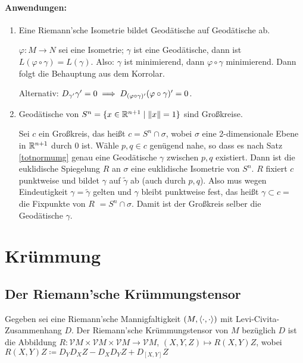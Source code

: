 \documentclass[a4paper,twoside,DIV15,BCOR12mm]{scrbook}
\renewcommand{\da}{\coloneqq}
\newcommand{\V}{\mathcal V}
\begin{document}
\subsubsection*{Anwendungen:}
\begin{enumerate}
\item Eine Riemann’sche Isometrie bildet Geodätische auf Geodätische ab.
\begin{beweis}
$\varphi: M \to N$ sei eine Isometrie; $\gamma$ ist eine Geodätische, dann ist $L(\varphi \circ \gamma) = L(\gamma)$. Also: $\gamma$ ist minimierend, dann $\varphi\circ \gamma$ minimierend. Dann folgt die Behauptung aus dem Korrolar.

Alternativ: $D_{\gamma'}{\gamma'} = 0 \implies D_{(\varphi\circ \gamma)'}(\varphi\circ\gamma)' = 0$.
\end{beweis}
\item Geodätische von $S^n=\{x \in \mathbb{R}^{n+1}\mid \|x\| = 1\}$ sind Großkreise.
\begin{beweis}
Sei $c$ ein Großkreis, das heißt $c = S^n \cap \sigma$, wobei $\sigma$ eine 2-dimensionale Ebene in $\mathbb{R}^{n+1}$ durch 0 ist. Wähle $p,q\in c$ genügend nahe, so dass es nach Satz \ref{totnormumg} genau eine Geodätische $\gamma$ zwischen $p,q$ existiert. Dann ist die euklidische Spiegelung $R$ an $\sigma$ eine euklidische Isometrie von $S^n$. $R$ fixiert $c$ punktweise und bildet $\gamma$  auf $\tilde\gamma$ ab (auch durch $p,q$). Also mus wegen Eindeutigkeit $\gamma = \tilde \gamma$ gelten und $\gamma$ bleibt punktweise fest, das heißt $\gamma\subset c = $ die Fixpunkte von $R$ $= S^n\cap \sigma$. Damit ist der Großkreis selber die Geodätische $\gamma$.
\end{beweis}
\end{enumerate}

\chapter{Krümmung}


\section{Der Riemann’sche Krümmungstensor}

Gegeben sei eine Riemann’sche Mannigfaltigkeit $(M,\langle\cdot,\cdot\rangle)$ mit Levi-Civita-Zusammenhang $D$. Der Riemann’sche Krümmungstensor von $M$ bezüglich $D$ ist die Abbildung $R:\V M\times \V M \times \V M \to \V M$, $(X,Y,Z) \mapsto R(X,Y)Z$, wobei $R(X,Y)Z \da D_YD_XZ - D_XD_YZ + D_{[X,Y]}Z$
\end{document}
